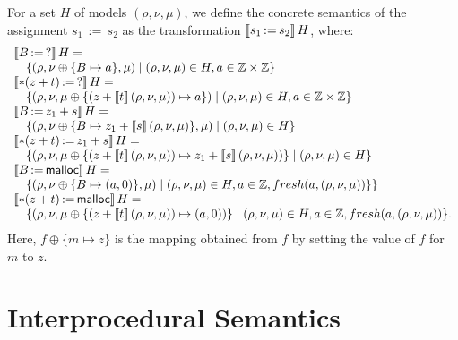 For a set $H$ of models $(\rho,\nu,\mu)$, we define the concrete semantics of the assignment
$s_1\,{:=}\,s_2$ as the transformation
$\llbracket s_1\,{:=}\,s_2\rrbracket\,H$, where:
\[
    \begin{array}{l}
        \llbracket B\,{:=}\,?\rrbracket\,H =
        \\
        \quad \{(\rho,\nu\oplus\{B\mapsto a\},\mu)\mid(\rho,\nu,\mu)\in H,a\in\mathbb{Z} \times \mathbb{Z}\}                   \\
        \llbracket*(z+t)\,{:=}\,?\rrbracket\,H =                                                                    \\
        \quad \{(\rho,\nu,\mu\oplus\{(z+\llbracket t\rrbracket\,(\rho,\nu,\mu))\mapsto a\})
        \mid(\rho,\nu,\mu)\in H,a\in\mathbb{Z} \times \mathbb{Z}\}                                                             \\
        \llbracket B\,{:=}\,z_1+s\rrbracket\,H =                                                                     \\
        \quad \{(\rho,\nu\oplus\{B\mapsto z_1+\llbracket s\rrbracket\,(\rho,\nu,\mu)\},\mu)\mid(\rho,\nu,\mu)\in H\} \\
        \llbracket*(z+t)\,{:=}\,z_1+s\rrbracket\,H =                                                                \\
        \quad \{(\rho,\nu,\mu\oplus\{(z+\llbracket t\rrbracket\,(\rho,\nu,\mu))\mapsto z_1+\llbracket s\rrbracket\,(\rho,\nu,\mu))\}
        \mid(\rho,\nu,\mu)\in H\}                                                                     \\
        \llbracket B\,{:=}\,\textsf{malloc}\rrbracket\,H =                                                                   \\
        \quad \{(\rho,\nu\oplus\{B\mapsto (a,0)\},\mu)\mid
        (\rho,\nu,\mu)\in H, a\in \mathbb{Z},
        fresh(a, (\rho,\nu,\mu))\}\}                                                                  \\
        \llbracket*(z+t)\,{:=}\,\textsf{malloc}\rrbracket\,H =
        \\
        \quad\{(\rho,\nu,\mu\oplus\{(z+\llbracket t\rrbracket\,(\rho,\nu,\mu))\mapsto (a,0))\}\mid
        (\rho,\nu,\mu)\in H, a\in \mathbb{Z}, fresh(a, (\rho, \nu, \mu))\}.
    \end{array}
\]
Here,
$f\oplus\{m\mapsto z\}$ is the mapping obtained
from $f$ by
setting the value of $f$ for $m$ to $z$.

\section{Interprocedural Semantics}

